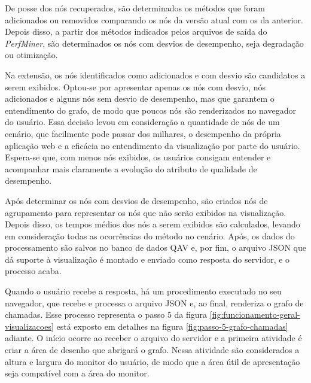 De posse dos nós recuperados, são determinados os métodos que foram adicionados ou removidos comparando os nós da versão atual com os da anterior. Depois disso, a partir dos métodos indicados pelos arquivos de saída do \textit{PerfMiner}, são determinados os nós com desvios de desempenho, seja degradação ou otimização.

Na extensão, os nós identificados como adicionados e com desvio são candidatos a serem exibidos. Optou-se por apresentar apenas os nós com desvio, nós adicionados e alguns nós sem desvio de desempenho, mas que garantem o entendimento do grafo, de modo que poucos nós são renderizados no navegador do usuário. Essa decisão levou em consideração a quantidade de nós de um cenário, que facilmente pode passar dos milhares, o desempenho da própria aplicação web e a eficácia no entendimento da visualização por parte do usuário. Espera-se que, com menos nós exibidos, os usuários consigam entender e acompanhar mais claramente a evolução do atributo de qualidade de desempenho.

Após determinar os nós com desvios de desempenho, são criados nós de agrupamento para representar os nós que não serão exibidos na visualização. Depois disso, os tempos médios dos nós a serem exibidos são calculados, levando em consideração todas as ocorrências do método no cenário. Após, os dados do processamento são salvos no banco de dados QAV e, por fim, o arquivo JSON que dá suporte à visualização é montado e enviado como resposta do servidor, e o processo acaba.

Quando o usuário recebe a resposta, há um procedimento executado no seu navegador, que recebe e processa o arquivo JSON e, ao final, renderiza o grafo de chamadas. Esse processo representa o passo 5 da figura \ref{fig:funcionamento-geral-visualizacoes} está exposto em detalhes na figura \ref{fig:passo-5-grafo-chamadas} adiante. O início ocorre ao receber o arquivo do servidor e a primeira atividade é criar a área de desenho que abrigará o grafo. Nessa atividade são considerados a altura e largura do monitor do usuário, de modo que a área útil de apresentação seja compatível com a área do monitor.

